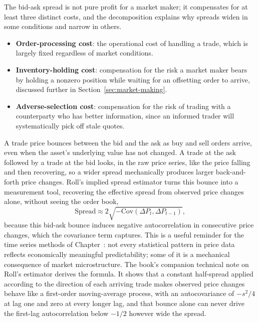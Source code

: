 \documentclass[../ai_in_finance]{subfiles}
\begin{document}
The bid-ask spread is not pure profit for a market maker; it compensates for at least three distinct costs, and the decomposition explains why spreads widen in some conditions and narrow in others.
\begin{itemize}
    \item \textbf{Order-processing cost}: the operational cost of handling a trade, which is largely fixed regardless of market conditions.
    \item \textbf{Inventory-holding cost}: compensation for the risk a market maker bears by holding a nonzero position while waiting for an offsetting order to arrive, discussed further in Section~\ref{sec:market-making}.
    \item \textbf{Adverse-selection cost}: compensation for the risk of trading with a counterparty who has better information, since an informed trader will systematically pick off stale quotes.
\end{itemize}
A trade price bounces between the bid and the ask as buy and sell orders arrive, even when the asset's underlying value has not changed. A trade at the ask followed by a trade at the bid looks, in the raw price series, like the price falling and then recovering, so a wider spread mechanically produces larger back-and-forth price changes. Roll's implied spread estimator \parencite{roll1984simple} turns this bounce into a measurement tool, recovering the effective spread from observed price changes alone, without seeing the order book,
\begin{equation}
\text{Spread} \approx 2\sqrt{-\text{Cov}(\Delta P_t, \Delta P_{t-1})},\label{eq:markets-roll-spread}
\end{equation}
because this bid-ask bounce induces negative autocorrelation in consecutive price changes, which the covariance term captures. This is a useful reminder for the time series methods of Chapter~: not every statistical pattern in price data reflects economically meaningful predictability; some of it is a mechanical consequence of market microstructure. The book's companion technical note on Roll's estimator derives the formula. It shows that a constant half-spread applied according to the direction of each arriving trade makes observed price changes behave like a first-order moving-average process, with an autocovariance of $-s^2/4$ at lag one and zero at every longer lag, and that bounce alone can never drive the first-lag autocorrelation below $-1/2$ however wide the spread.
\end{document}
